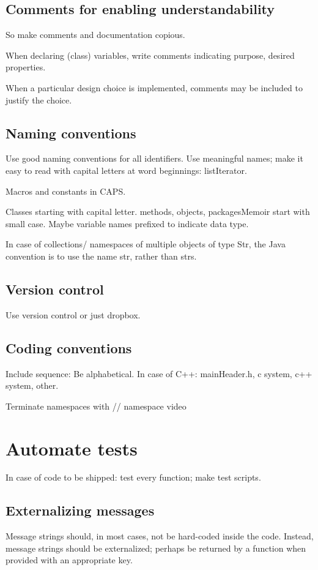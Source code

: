 \documentclass[oneside, article]{memoir}
\begin{document}
\subsection{Comments for enabling understandability}
So make comments and documentation copious.

When declaring (class) variables, write comments indicating purpose, desired properties.

When a particular design choice is implemented, comments may be included to justify the choice.

\subsection{Naming conventions}
Use good naming conventions for all identifiers. Use meaningful names; make it easy to read with capital letters at word beginnings: listIterator.

Macros and constants in CAPS.

Classes starting with capital letter. methods, objects, packagesMemoir start with small case. Maybe variable names prefixed to indicate data type.

In case of collections/ namespaces of multiple objects of type Str, the Java convention is to use the name str, rather than strs.

\subsection{Version control}
Use version control or just dropbox. \tbc

\subsection{Coding conventions}
\subitem Include sequence: Be alphabetical. In case of C++: mainHeader.h, c system, c++ system, other.

\subitem Terminate namespaces with // namespace video

\section{Automate tests}
In case of code to be shipped: test every function; make test scripts.

\subsection{Externalizing messages}
Message strings should, in most cases, not be hard-coded inside the code. Instead, message strings should be externalized; perhaps be returned by a function when provided with an appropriate key. 
\end{document}
